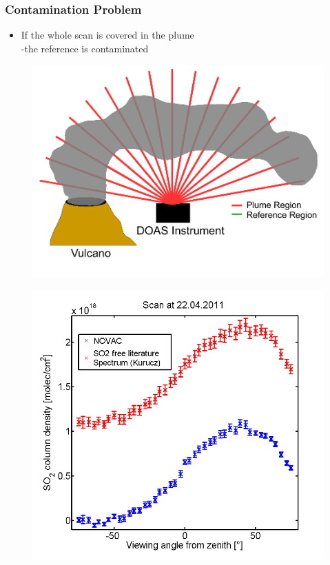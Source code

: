 \documentclass[aspectratio=169]{beamer} %
\begin{document}
	\begin{frame}
		\frametitle{\color{mygreen}Contamination Problem\\%
			\color{mygreen}{\rule{0.8\textwidth}{2pt}}}
		
		\vspace{-1cm}
		\begin{block}{}

				\begin{itemize}
					\item If the whole scan is covered in the plume\\
					\quad -the reference is contaminated
				\end{itemize}

		\end{block}
	\vspace{1cm}
		\begin{multicols}{2}
			\begin{figure}
				\centering
				\includegraphics[width=0.9\linewidth]{../../Bilder/ContaminationVisualization}
				\label{fig:doasfunction}
			\end{figure}
			\begin{figure}
				\centering
				\vspace*{-1.7cm}
				\includegraphics[width=0.9\linewidth]{../../Bilder/contaminated}

\end{figure}
\end{multicols}
\end{frame}
\end{document}
